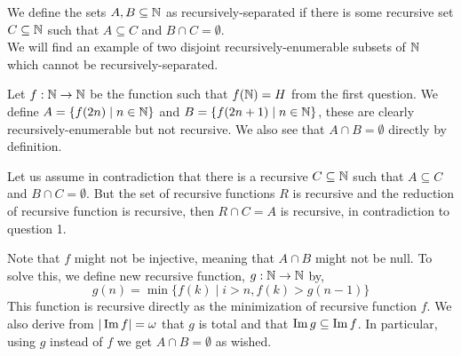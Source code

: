 \question{}
We define the sets $A, B \subseteq \mathbb{N}$ as recursively-separated if there is some recursive set $C \subseteq \mathbb{N}$ such that $A \subseteq C$ and $B \cap C = \emptyset$. \\
We will find an example of two disjoint recursively-enumerable subsets of $\mathbb{N}$ which cannot be recursively-separated.
\begin{solution}
	Let $f : \mathbb{N} \to \mathbb{N}$ be the function such that $f(\mathbb{N}) = H$ from the first question.
	We define $A = \{ f(2n) \mid n \in \mathbb{N} \}$ and $B = \{ f(2n + 1) \mid n \in \mathbb{N} \}$, these are clearly recursively-enumerable but not recursive.
	We also see that $A \cap B = \emptyset$ directly by definition.

	Let us assume in contradiction that there is a recursive $C \subseteq \mathbb{N}$ such that $A \subseteq C$ and $B \cap C = \emptyset$.
	But the set of recursive functions $R$ is recursive and the reduction of recursive function is recursive, then $R \cap C = A$ is recursive, in contradiction to question 1.

	Note that $f$ might not be injective, meaning that $A \cap B$ might not be null.
	To solve this, we define new recursive function, $g : \mathbb{N} \to \mathbb{N}$ by,
	\[
		g(n)
		= \min\{ f(k) \mid i > n, f(k) > g(n - 1) \}
	\]
	This function is recursive directly as the minimization of recursive function $f$.
	We also derive from $|\operatorname{Im} f| = \omega$ that $g$ is total and that $\operatorname{Im} g \subseteq \operatorname{Im} f$.
	In particular, using $g$ instead of $f$ we get $A \cap B = \emptyset$ as wished.
\end{solution}



